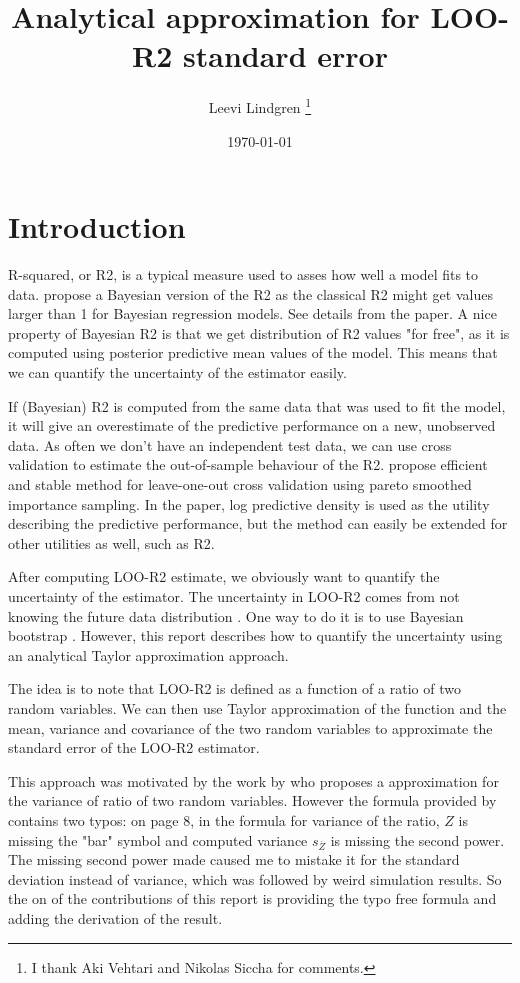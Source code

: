 \documentclass{article}
\title{Analytical approximation for LOO-R2 standard error}
\author{Leevi Lindgren \footnote{I thank Aki Vehtari and Nikolas Siccha for comments.}}
\date{\today}
\begin{document}
\maketitle

\section{Introduction}
R-squared, or R2, is a typical measure used to asses how well a model fits to data. \cite{gelman_r-squared_2019} propose a Bayesian version of the R2 as the classical R2 might get values larger than 1 for Bayesian regression models. See details from the paper. A nice property of Bayesian R2 is that we get distribution of R2 values "for free", as it is computed using posterior predictive mean values of the model. This means that we can quantify the uncertainty of the estimator easily.

If (Bayesian) R2 is computed from the same data that was used to fit the model, it will give an overestimate of the predictive performance on a new, unobserved data. As often we don't have an independent test data, we can use cross validation to estimate the out-of-sample behaviour of the R2. \cite{vehtari_practical_2016} propose efficient and stable method for leave-one-out cross validation using pareto smoothed importance sampling. In the paper, log predictive density is used as the utility describing the predictive performance, but the method can easily be extended for other utilities as well, such as R2.

After computing LOO-R2 estimate, we obviously want to quantify the uncertainty of the estimator. The uncertainty in LOO-R2 comes from not knowing the future data distribution \citep{vehtari_survey_2012}. One way to do it is to use Bayesian bootstrap \citep{rubin_bayesian_1981}. However, this report describes how to quantify the uncertainty using an analytical Taylor approximation approach.

The idea is to note that LOO-R2 is defined as a function of a ratio of two random variables. We can then use Taylor approximation of the function and the mean, variance and covariance of the two random variables to approximate the standard error of the LOO-R2 estimator. 

This approach was motivated by the work by \cite{hastings1970monte} who proposes a approximation for the variance of ratio of two random variables. However the formula provided by \cite{hastings1970monte} contains two typos: on page 8, in the formula for variance of the ratio, $Z$ is missing the "bar" symbol and computed variance $s_{\bar{Z}}$ is missing the second power. The missing second power made caused me to mistake it for the standard deviation instead of variance, which was followed by weird simulation results. So the on of the contributions of this report is providing the typo free formula and adding the derivation of the result.
\end{document}
